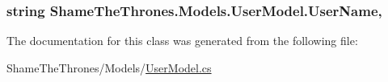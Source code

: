 \subsubsection[{\texorpdfstring{User\+Name}{UserName}}]{\setlength{\rightskip}{0pt plus 5cm}string Shame\+The\+Thrones.\+Models.\+User\+Model.\+User\+Name\hspace{0.3cm}{\ttfamily [get]}, {\ttfamily [set]}}\hypertarget{class_shame_the_thrones_1_1_models_1_1_user_model_a666db1c87db096237e789ee3251deb41}{}\label{class_shame_the_thrones_1_1_models_1_1_user_model_a666db1c87db096237e789ee3251deb41}


The documentation for this class was generated from the following file\+:\begin{DoxyCompactItemize}
\item 
Shame\+The\+Thrones/\+Models/\hyperlink{_user_model_8cs}{User\+Model.\+cs}\end{DoxyCompactItemize}

